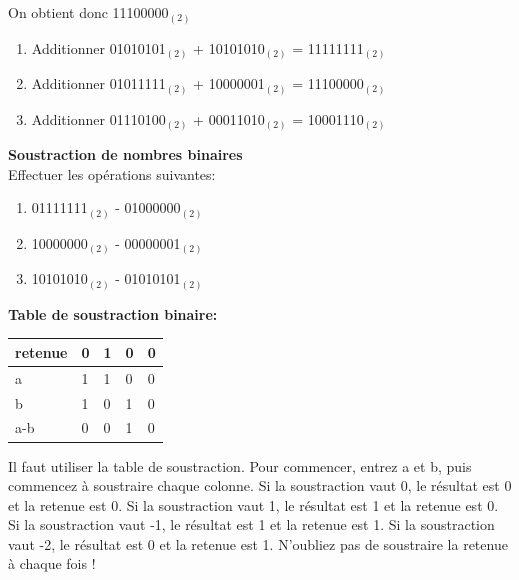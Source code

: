 \begin{Exercice}[15 minutes]
\begin{solution}
        On obtient donc 11100000$_{(2)}$ \\
        
        \begin{enumerate}
        \item Additionner 01010101$_{(2)}$ + 10101010$_{(2)}$ = 11111111$_{(2)}$
        \item Additionner 01011111$_{(2)}$ + 10000001$_{(2)}$ = 11100000$_{(2)}$
        \item Additionner 01110100$_{(2)}$ + 00011010$_{(2)}$ = 10001110$_{(2)}$
    	\end{enumerate}
    \end{solution}
\end{Exercice}

\begin{Exercice}[15 minutes] \textbf{Soustraction de nombres binaires}\\
    Effectuer les opérations suivantes:

    \begin{enumerate}
        \item 01111111$_{(2)}$ - 01000000$_{(2)}$
        \item 10000000$_{(2)}$ - 00000001$_{(2)}$
        \item 10101010$_{(2)}$ - 01010101$_{(2)}$
    \end{enumerate}

    \begin{conseil}
        \textbf{Table de soustraction binaire:}\\
         \begin{tabular}{| C{0.1\textwidth} | C{0.1\textwidth} | C{0.1\textwidth} | C{0.1\textwidth} | C{0.1\textwidth} |} 
            \hline
            retenue & 0 & 1 & 0 & 0 \\ [0.5ex] 
            \hline
            a & 1 & 1 & 0 & 0 \\ [0.5ex] 
            \hline
            b & 1 & 0 & 1 & 0 \\ [0.5ex] 
            \hline
            a-b & 0 & 0 & 1 & 0 \\ [0.5ex] 
            \hline
        \end{tabular}
    \end{conseil}
    
    \begin{solution}
         Il faut utiliser la table de soustraction. Pour commencer, entrez a et b, puis commencez à soustraire chaque colonne. Si la soustraction vaut 0, le résultat est 0 et la retenue est 0. Si la soustraction vaut 1, le résultat est 1 et la retenue est 0. Si la soustraction vaut -1, le résultat est 1 et la retenue est 1. Si la soustraction vaut -2, le résultat est 0 et la retenue est 1. N'oubliez pas de soustraire la retenue à chaque fois ! \\


\end{solution}
\end{Exercice}
